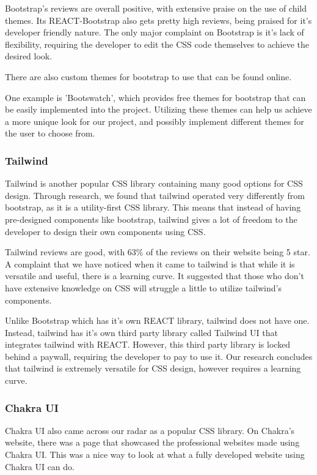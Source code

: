 \documentclass[12pt]{article}
\begin{document}
Bootstrap's reviews are overall positive, with extensive praise on the use of child themes.
Its REACT-Bootstrap also gets pretty high reviews, being praised for it's developer friendly nature.
The only major complaint on Bootstrap is it's lack of flexibility, requiring the developer to edit the CSS code themselves to achieve the desired look.

There are also custom themes for bootstrap to use that can be found online.

One example is 'Bootswatch', which provides free themes for bootstrap that can be easily implemented into the project.
Utilizing these themes can help us achieve a more unique look for our project, and possibly implement different themes for the user to choose from.

\subsubsection{Tailwind}
Tailwind is another popular CSS library containing many good options for CSS design.
Through research, we found that tailwind operated very differently from bootstrap, as it is a utility-first CSS library.
This means that instead of having pre-designed components like bootstrap, tailwind gives a lot of freedom to the developer to design their own components using CSS.

Tailwind reviews are good, with 63\% of the reviews on their website being 5 star.
A complaint that we have noticed when it came to tailwind is that while it is versatile and useful, there is a learning curve.
It suggested that those who don't have extensive knowledge on CSS will struggle a little to utilize tailwind's components.

Unlike Bootstrap which has it's own REACT library, tailwind does not have one.
Instead, tailwind has it's own third party library called Tailwind UI that integrates tailwind with REACT.
However, this third party library is locked behind a paywall, requiring the developer to pay to use it.
Our research concludes that tailwind is extremely versatile for CSS design, however requires a learning curve.

\subsubsection{Chakra UI}
Chakra UI also came across our radar as a popular CSS library.
On Chakra's website, there was a page that showcased the professional websites made using Chakra UI.
This was a nice way to look at what a fully developed website using Chakra UI can do.
\end{document}
